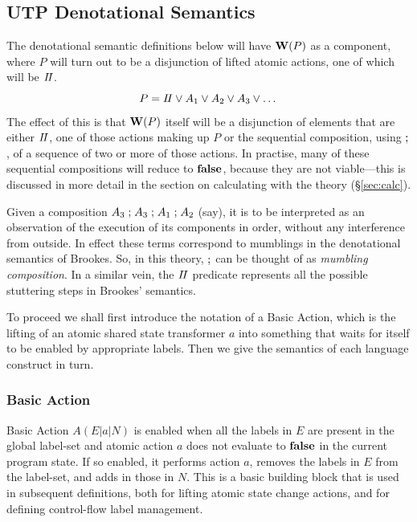 \subsection{UTP Denotational Semantics}\label{ssec:UTP-denote}

The denotational semantic definitions below will have
$\mathbf{W}(P)$ as a component,
where $P$ will turn out to be a disjunction of lifted atomic actions,
one of which will be $I\!I$.
\[
  P = I\!I \lor A_1 \lor A_2 \lor A_3 \lor \dots
\]
The effect of this is that $\mathbf{W}(P)$ itself
will be a disjunction of elements that are
either $I\!I$, one of those actions making up $P$
or the sequential composition, using $\mathrel{;}$,
of a sequence of two or more of those actions.
In practise, many of these sequential compositions will reduce to $\mathbf{false}$,
because they are not viable---this is discussed in more detail in the section
on calculating with the theory (\S\ref{sec:calc}).

Given a composition $A_3\mathrel{;} A_3\mathrel{;} A_1 \mathrel{;} A_2$ (say),
it is to be interpreted as an observation
of the execution of its components in order,
without any interference from outside.
In effect these terms correspond to mumblings in the denotational
semantics of Brookes\cite{DBLP:journals/iandc/Brookes96}.
So, in this theory, $\mathrel{;}$ can be thought of as \emph{mumbling composition}.
In a similar vein, the $I\!I$ predicate represents
all the possible stuttering steps in Brookes' semantics.


To proceed we shall first introduce the notation of a Basic Action,
which is the lifting of an atomic shared state transformer $a$
into something that waits for itself to be enabled by appropriate labels.
Then we give the semantics of each language construct in turn.


\subsubsection{Basic Action}\label{sssec:basic-action}

Basic Action $A(E|a|N)$ is enabled when all the labels in $E$
are present in the global label-set
and atomic action $a$ does not evaluate to $\mathbf{false}$
in the current program state.
If so enabled,  it performs action $a$, removes the labels in $E$
from the label-set, and adds in those in $N$.
This is a basic building block that is used in subsequent
definitions, both for lifting atomic state change actions,
and for defining control-flow label management.

